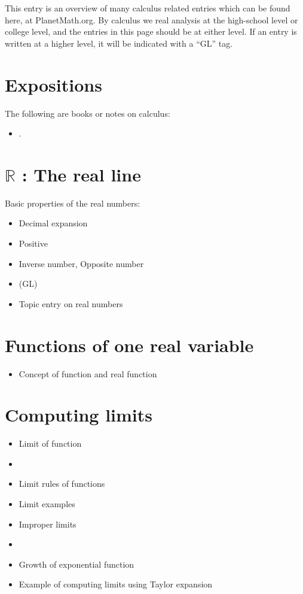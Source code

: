 \documentclass[12pt]{article}
\theoremstyle{definition}
\newcommand{\Reals}{\mathbb{R}}
\begin{document}
This entry is an overview of many calculus related entries which can be found here, at PlanetMath.org. By calculus we  real analysis at the high-school level or college level, and the entries in this page should be at either level. If an entry is written at a higher level, it will be indicated with a ``GL'' tag.

\section{Expositions}
The following are books or notes on calculus:
\begin{itemize}
\item {}.
\end{itemize}

\section{$\Reals$ : The real line}
Basic properties of the real numbers:
\begin{itemize}
\item Decimal expansion
\item Positive
\item Inverse number, Opposite number
\item (GL)  
\item Topic entry on real numbers
\end{itemize}

\section{Functions of one real variable}
\begin{itemize}
\item Concept of function and real function 
\end{itemize}

\section{Computing limits}
\begin{itemize}
\item Limit of function
\item {}
\item Limit rules of functions
\item Limit examples
\item Improper limits
\item {}
\item Growth of exponential function
\item Example of computing limits using Taylor expansion
\end{itemize}
\end{document}
